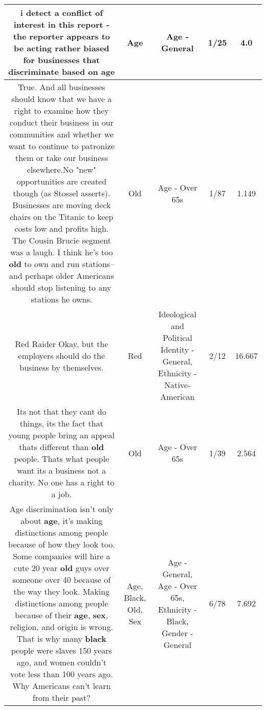 \documentclass[11pt]{article}
\newlength\mylength
\begin{document}
\begin{center}
\begin{longtable}{|C{.65\mylength}|C{.30\mylength}|C{.12\mylength}|C{.12\mylength}|C{.12\mylength}|}
  \small i detect a conflict of interest in this report - the reporter appears to be acting rather biased for businesses that discriminate based on age\normalsize   & Age & Age - General & 1/25 & 4.0 \\  \hline
  \small True. And all businesses should know that we have a right to examine how they conduct their business in our communities and whether we want to continue to patronize them or take our business elsewhere.No "new" opportunities are created though (as Stossel asserts). Businesses are moving deck chairs on the Titanic to keep costs low and profits high. The Cousin Brucie segment was a laugh. I think he's too \textbf{old} to own and run stations--and perhaps older Americans should stop listening to any stations he owns.\normalsize   & Old & Age - Over 65s & 1/87 & 1.149 \\  \hline
  \small Red Raider Okay, but the employers should do the business by themselves.\normalsize   & Red &  Ideological and Political Identity - General, Ethnicity - Native-American & 2/12 & 16.667 \\  \hline
  \small Its not that they cant do things, its the fact that young people bring an appeal thats different than \textbf{old} people. Thats what people want its a business not a charity. No one has a right to a job.\normalsize   & Old & Age - Over 65s & 1/39 & 2.564 \\  \hline
  \small Age discrimination isn't only about \textbf{age}, it's making distinctions among people because of how they look too. Some companies will hire a cute 20 year \textbf{old} guys over someone over 40 because of the way they look. Making distinctions among people because of their \textbf{age}, \textbf{sex}, religion, and origin is wrong. That is why many \textbf{black} people were slaves 150 years ago, and women couldn't vote less than 100 years ago. Why Americans can't learn from their past?\normalsize   & Age, Black, Old, Sex & Age - General, Age - Over 65s, Ethnicity - Black, Gender - General & 6/78 & 7.692 \\  \hline

\end{longtable}
\end{center}
\end{document}
